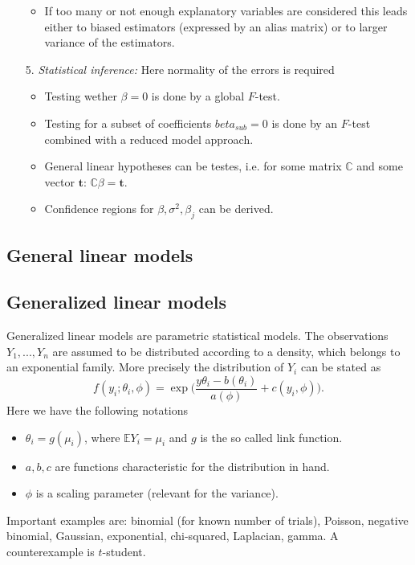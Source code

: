 \documentclass[12pt,a4paper]{amsart}
\theoremstyle{definition}
\theoremstyle{remark}
\numberwithin{equation}{section}
\begin{document}
\begin{itemize}
\begin{itemize}
\item If too many or not enough explanatory variables are considered this leads either to biased estimators (expressed by an alias matrix) or to larger variance of the estimators.
\end{itemize}
\item[5.] \textit{Statistical inference:} 
Here normality of the errors is required
\begin{itemize}
\item Testing wether $\beta=0$ is done by a global $F$-test.
\item Testing for a subset of coefficients $beta_{sub}=0$ is done by an $F$-test combined with a reduced model approach.
\item General linear hypotheses can be testes, i.e. for some matrix $\mathbb{C}$ and some vector $\mathbf{t}$: $\mathbb{C}\beta=\mathbf{t}$.
\item Confidence regions for $\beta, \sigma^2, \beta_j$ can be derived. 
\end{itemize}
\end{itemize}

\subsection{General linear models}

\subsection{Generalized linear models} %

Generalized linear models are parametric statistical models. The observations $Y_1,...,Y_n$ are assumed to be distributed according to a density, which belongs to an exponential family. More precisely the distribution of $Y_i$ can be stated as
$$ f(y_i; \theta_i, \phi)= \exp \Big(\frac{y \theta_i - b(\theta_i)}{a(\phi)}+c(y_i, \phi) \Big).$$
Here we have the following notations
\begin{itemize}
\item $\theta_i=g(\mu_i)$, where $\mathbb{E}Y_i=\mu_i$ and $g$ is the so called link function. 
\item $a, b, c$ are functions characteristic for the distribution in hand.
\item $\phi$ is a scaling parameter (relevant for the variance).
\end{itemize}

Important examples are: binomial (for known number of trials), Poisson, negative binomial, Gaussian, exponential, chi-squared, Laplacian, gamma. A counterexample is $t$-student.
\end{document}
